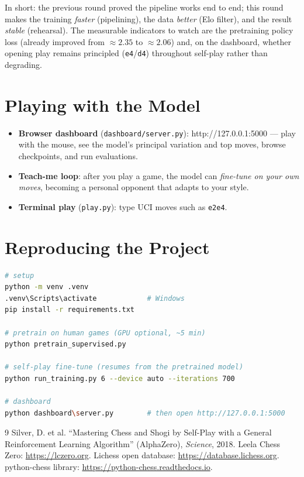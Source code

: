 \documentclass[11pt,a4paper]{article}
\begin{document}
\noindent
In short: the previous round proved the pipeline works end to end; this round
makes the training \emph{faster} (pipelining), the data \emph{better}
(Elo filter), and the result \emph{stable} (rehearsal). The measurable
indicators to watch are the pretraining policy loss (already improved from
${\approx}2.35$ to ${\approx}2.06$) and, on the dashboard, whether opening
play remains principled (\texttt{e4}/\texttt{d4}) throughout self-play rather
than degrading.

\section{Playing with the Model}

\begin{itemize}
  \item \textbf{Browser dashboard} (\texttt{dashboard/server.py}):
        http://127.0.0.1:5000 --- play with the mouse, see the model's
        principal variation and top moves, browse checkpoints, and run
        evaluations.
  \item \textbf{Teach-me loop}: after you play a game, the model can
        \emph{fine-tune on your own moves}, becoming a personal opponent that
        adapts to your style.
  \item \textbf{Terminal play} (\texttt{play.py}): type UCI moves such as
        \texttt{e2e4}.
\end{itemize}

\section{Reproducing the Project}

\begin{lstlisting}[language=bash]
# setup
python -m venv .venv
.venv\Scripts\activate            # Windows
pip install -r requirements.txt

# pretrain on human games (GPU optional, ~5 min)
python pretrain_supervised.py

# self-play fine-tune (resumes from the pretrained model)
python run_training.py 6 --device auto --iterations 700

# dashboard
python dashboard\server.py        # then open http://127.0.0.1:5000
\end{lstlisting}

\begin{thebibliography}{9}
 Silver, D. et al. ``Mastering Chess and Shogi by Self-Play with
  a General Reinforcement Learning Algorithm'' (AlphaZero), \emph{Science},
  2018.
 Leela Chess Zero: \url{https://lczero.org}.
 Lichess open database: \url{https://database.lichess.org}.
 python-chess library: \url{https://python-chess.readthedocs.io}.
\end{thebibliography}
\end{document}
